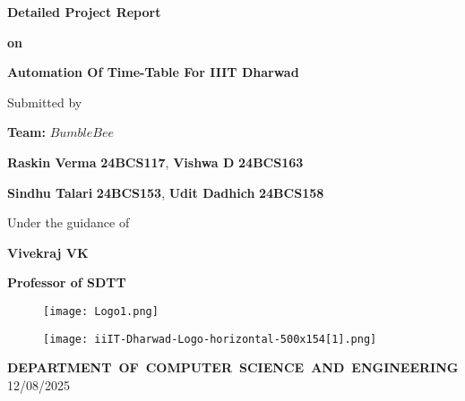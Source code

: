 \documentclass[12pt]{article}
\begin{document}
\begin{titlepage}
\doublespacing

\begin{center}
\par {\large \textbf{Detailed Project Report}}\\
\end{center}

\begin{center}
	\par {\large \textbf{on}}
\end{center}


\begin{center}
{\Large \textbf{Automation Of Time-Table For IIIT Dharwad}}
\end{center}

{\small
\begin{center}
\par \small {Submitted by}
\par \Large \textbf{Team: }\textbf{$BumbleBee$}

\par \large \textbf{Raskin Verma} \textbf{24BCS117}, \textbf{Vishwa D} \textbf{24BCS163} 
\par \large \textbf{Sindhu Talari} \textbf{24BCS153}, \textbf{Udit Dadhich} \textbf{24BCS158}
 
\par Under the guidance of
\par \large \textbf{Vivekraj VK}
\par \textbf{Professor of SDTT}
\end{center}
}
\begin{figure}[H]
    \centering
    \texttt{[image: Logo1.png]}
\end{figure}
\begin{figure}[H]
    \centering
    \texttt{[image: iiIT-Dharwad-Logo-horizontal-500x154[1].png]}
\end{figure}

\begin{center}
\par{\mbox {\small\textbf{DEPARTMENT OF COMPUTER SCIENCE AND ENGINEERING}}}
\\
12/08/2025

\end{center}
\end{titlepage}
\end{document}
